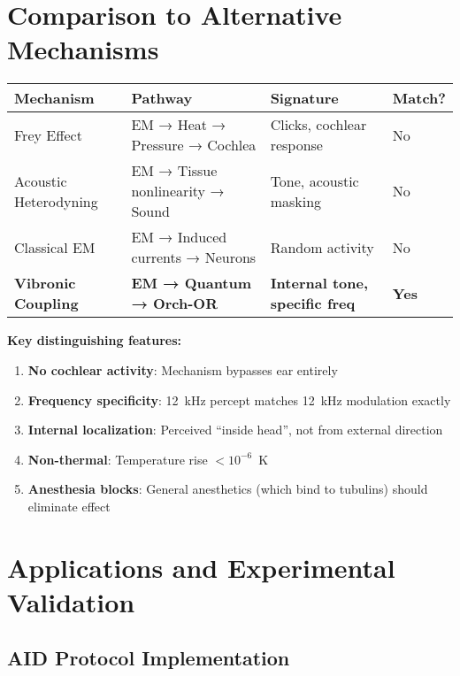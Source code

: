 \section{Comparison to Alternative Mechanisms}

\begin{center}
\begin{tabular}{@{}llll@{}}
\toprule
\textbf{Mechanism} & \textbf{Pathway} & \textbf{Signature} & \textbf{Match?} \\
\midrule
Frey Effect & EM → Heat → Pressure → Cochlea & Clicks, cochlear response & No \\
Acoustic Heterodyning & EM → Tissue nonlinearity → Sound & Tone, acoustic masking & No \\
Classical EM & EM → Induced currents → Neurons & Random activity & No \\
\textbf{Vibronic Coupling} & \textbf{EM → Quantum → Orch-OR} & \textbf{Internal tone, specific freq} & \textbf{Yes} \\
\bottomrule
\end{tabular}
\end{center}

\begin{keyconcept}
\textbf{Key distinguishing features:}
\begin{enumerate}
\item \textbf{No cochlear activity}: Mechanism bypasses ear entirely
\item \textbf{Frequency specificity}: 12~kHz percept matches 12~kHz modulation exactly
\item \textbf{Internal localization}: Perceived ``inside head'', not from external direction
\item \textbf{Non-thermal}: Temperature rise $<10^{-6}$~K
\item \textbf{Anesthesia blocks}: General anesthetics (which bind to tubulins) should eliminate effect
\end{enumerate}
\end{keyconcept}

\section{Applications and Experimental Validation}

\subsection{AID Protocol Implementation}

